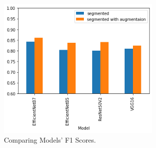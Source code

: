 \documentclass[12pt]{diazessay}
\begin{document}
    \begin{figure}[htbp]
        \centering
        \includegraphics[width=8cm]{charts/ComparingF1Scores.png}
        \caption[comparing models' F1 Scores]{Comparing Models' F1 Scores.}
        \label{tab:SVM results}
    \end{figure} 


    \begin{table}[H]
    \begin{center}
    \end{center}
    \caption{SVM testing results.}
    \end{table}
    

\end{document}
